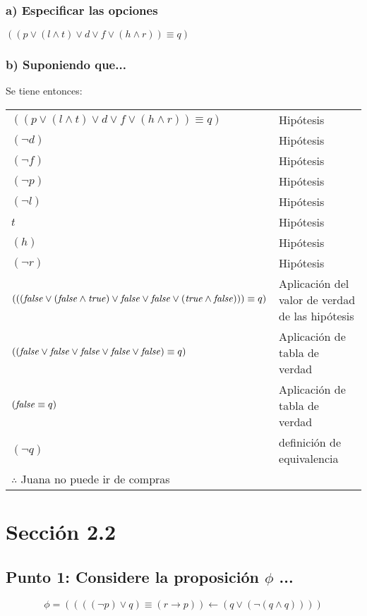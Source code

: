 \documentclass{article}
\begin{document}
\subsubsection{a) Especificar las opciones}
$((p \vee (l \wedge t) \vee d \vee f \vee (h \wedge r)) \equiv q)$
\subsubsection{b) Suponiendo que...}
Se tiene entonces:
\begin{center}
    \begin{NiceTabular}{l l}
        $((p \vee (l \wedge t) \vee d \vee f \vee (h \wedge r)) \equiv q)$ & Hipótesis\\
        $(\lnot d)$ & Hipótesis\\
        $(\lnot f)$ & Hipótesis\\
        $(\lnot p)$ & Hipótesis\\
        $(\lnot l)$ & Hipótesis\\
        $t$ & Hipótesis\\
        $(h)$ & Hipótesis\\
        $(\lnot r)$ & Hipótesis\\
        \hline
        $(((\textrm{\textit{false}} \vee (\textrm{\textit{false}} \wedge \textrm{\textit{true}}) \vee \textrm{\textit{false}} \vee \textrm{\textit{false}} \vee (\textrm{\textit{true}} \wedge \textrm{\textit{false}}) )) \equiv q)$ & Aplicación del valor de verdad de las hipótesis\\
        $((\textrm{\textit{false}} \vee \textrm{\textit{false}} \vee \textrm{\textit{false}} \vee \textrm{\textit{false}} \vee \textrm{\textit{false}}) \equiv q)$ & Aplicación de tabla de verdad\\
        $(\textrm{\textit{false}} \equiv q)$ & Aplicación de tabla de verdad\\
        $(\lnot q)$ & definición de equivalencia\\
        \hline
        \hline
        $\therefore$ Juana no puede ir de compras
    \end{NiceTabular}
\end{center}
\section{Sección 2.2}
\subsection{Punto 1: Considere la proposición $\phi$ ...}
$$\phi = ((((\lnot p)\vee q)\equiv(r \to p))\gets(q \vee (\lnot (q \wedge q))))$$
\end{document}
